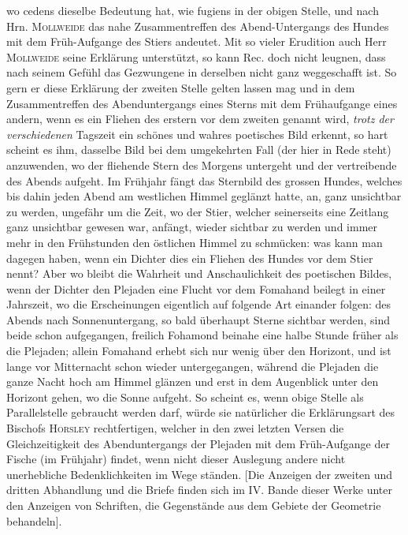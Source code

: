 \noindent wo cedens dieselbe Bedeutung hat, wie fugiens in der obigen Stelle, und nach Hrn. \textsc{Mollweide} das nahe Zusammentreffen des Abend-Untergangs des Hundes mit dem Früh-Aufgange des Stiers andeutet. Mit so vieler Erudition auch Herr \textsc{Mollweide} seine Erklärung unterstützt, so kann Rec. doch nicht leugnen, dass nach seinem Gefühl das Gezwungene in derselben nicht ganz weggeschafft ist. So gern er diese Erklärung der zweiten Stelle gelten lassen mag und in dem Zusammentreffen des Abenduntergangs eines Sterns mit dem Frühaufgange eines andern, wenn es ein Fliehen des erstern vor dem zweiten genannt wird, \emph{trotz der verschiedenen} Tagszeit ein schönes und wahres poetisches Bild erkennt, so hart scheint es ihm, dasselbe Bild bei dem umgekehrten Fall (der hier in Rede steht) anzuwenden, wo der fliehende Stern des Morgens untergeht und der vertreibende des Abends aufgeht. Im Frühjahr fängt das Sternbild des grossen Hundes, welches bis dahin jeden Abend am westlichen Himmel geglänzt hatte, an, ganz unsichtbar zu werden, ungefähr um die Zeit, wo der Stier, welcher seinerseits eine Zeitlang ganz unsichtbar gewesen war, anfängt, wieder sichtbar zu werden und immer mehr in den Frühstunden den östlichen Himmel zu schmücken: was kann man dagegen haben, wenn ein Dichter dies ein Fliehen des Hundes vor dem Stier nennt? Aber wo bleibt die Wahrheit und Anschaulichkeit des poetischen Bildes, wenn der Dichter den Plejaden eine Flucht vor dem Fomahand beilegt in einer Jahrszeit, wo die Erscheinungen eigentlich auf folgende Art einander folgen: des Abends nach Sonnenuntergang, so bald überhaupt Sterne sichtbar werden, sind beide schon aufgegangen, freilich Fohamond beinahe eine halbe Stunde früher als die Plejaden; allein Fomahand erhebt sich nur wenig über den Horizont, und ist lange vor Mitternacht schon wieder untergegangen, während die Plejaden die ganze Nacht hoch am Himmel glänzen und erst in dem Augenblick unter den Horizont gehen, wo die Sonne aufgeht. So scheint es, wenn obige Stelle als Parallelstelle gebraucht werden darf, würde sie natürlicher die Erklärungsart des Bischofs \textsc{Horsley} rechtfertigen, welcher in den zwei letzten Versen die Gleichzeitigkeit des Abenduntergangs der Plejaden mit dem Früh-Aufgange der Fische (im Frühjahr) findet, wenn nicht dieser Auslegung andere nicht unerhebliche Bedenklichkeiten im Wege ständen. [Die Anzeigen der zweiten und dritten Abhandlung und die Briefe finden sich im IV. Bande dieser Werke unter den Anzeigen von Schriften, die Gegenstände aus dem Gebiete der Geometrie behandeln].
